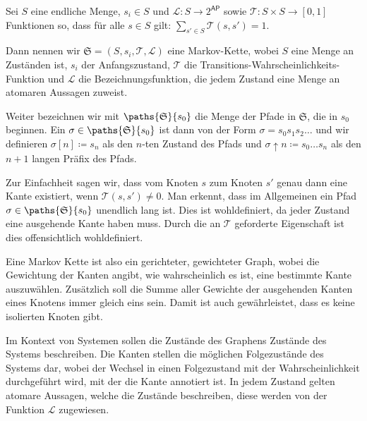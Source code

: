 \begin{definition}
	Sei $S$ eine endliche Menge, $s_i\in S$ und $\mathcal{L}:S\to 2^\mathsf{AP}$ sowie $\mathcal{T}:S\times S \to [0,1]$ Funktionen so, dass für alle $s\in S$ gilt: $\sum_{s'\in S}\mathcal{T}(s,s')=1$.
	
	Dann nennen wir $\mathfrak{S}=(S, s_i, \mathcal{T}, \mathcal{L})$ eine Markov-Kette, wobei $S$ eine Menge an Zuständen ist, $s_i$ der Anfangszustand, $\mathcal{T}$ die Transitions-Wahrscheinlichkeits-Funktion und $\mathcal{L}$ die Bezeichnungsfunktion, die jedem Zustand eine Menge an atomaren Aussagen zuweist.
	
	Weiter bezeichnen wir mit $\paths{\mathfrak{S}}{s_0}$ die Menge der Pfade in $\mathfrak{S}$, die in $s_0$ beginnen. 
	Ein $\sigma\in \paths{\mathfrak{S}}{s_0}$ ist dann von der Form $\sigma=s_0s_1s_2\dots$ und wir definieren $\sigma[n]\coloneqq s_n$ als den $n$-ten Zustand des Pfads und $\sigma\uparrow n\coloneqq s_0\dots s_n$ als den $n+1$ langen Präfix des Pfads.
	\cite{hansson1994logic}
\end{definition}

Zur Einfachheit sagen wir, dass vom Knoten $s$ zum Knoten $s'$ genau dann eine Kante existiert, wenn $\mathcal{T}(s, s') \neq 0$.
Man erkennt, dass im Allgemeinen ein Pfad $\sigma\in \paths{\mathfrak{S}}{s_0}$ unendlich lang ist. 
Dies ist wohldefiniert, da jeder Zustand eine ausgehende Kante haben muss. Durch die an $\mathcal{T}$ geforderte Eigenschaft ist dies offensichtlich wohldefiniert.

Eine Markov Kette ist also ein gerichteter, gewichteter Graph, wobei die Gewichtung der Kanten angibt, wie wahrscheinlich es ist, eine bestimmte Kante auszuwählen. Zusätzlich soll die Summe aller Gewichte der ausgehenden Kanten eines Knotens immer gleich eins sein. Damit ist auch gewährleistet, dass es keine isolierten Knoten gibt.

Im Kontext von Systemen sollen die Zustände des Graphens Zustände des Systems beschreiben. 
Die Kanten stellen die möglichen Folgezustände des Systems dar, wobei der Wechsel in einen Folgezustand mit der Wahrscheinlichkeit durchgeführt wird, mit der die Kante annotiert ist. 
In jedem Zustand gelten atomare Aussagen, welche die Zustände beschreiben, diese werden von der Funktion $\mathcal{L}$ zugewiesen.

